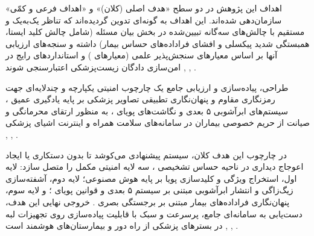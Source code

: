 



اهداف این پژوهش در دو سطح «هدف اصلی (کلان)» و «اهداف فرعی و کمّی» سازمان‌دهی شده‌اند. این اهداف به گونه‌ای تدوین گردیده‌اند که تناظر یک‌به‌یک و مستقیم با چالش‌های سه‌گانه تبیین‌شده در بخش بیان مسئله (شامل چالش کلید ایستا، همبستگی شدید پیکسلی و افشای فراداده‌های حساس بیمار) داشته و سنجه‌های ارزیابی آنها بر اساس معیارهای سنجش‌پذیر علمی (معیارهای ) و استانداردهای رایج در امن‌سازی دادگان زیست‌پزشکی اعتبارسنجی شوند , , .\par




طراحی، پیاده‌سازی و ارزیابی جامع یک چارچوب امنیتی یکپارچه و چندلایه‌ای جهت رمزنگاری مقاوم و پنهان‌نگاری تطبیقی تصاویر پزشکی بر پایه یادگیری عمیق ، سیستم‌های ابرآشوبی ۵ بعدی و نگاشت‌های پویای ، به منظور ارتقای محرمانگی و صیانت از حریم خصوصی بیماران در سامانه‌های سلامت همراه و اینترنت اشیای پزشکی , , .\par



در چارچوب این هدف کلان، سیستم پیشنهادی می‌کوشد تا بدون دستکاری یا ایجاد اعوجاج دیداری در ناحیه حساس تشخیصی ، سه لایه امنیتی مکمل را متصل سازد: لایه اول، استخراج ویژگی و کلیدسازی پویا بر پایه هوش مصنوعی؛ لایه دوم، آشفته‌سازی زیگ‌زاگی و انتشار ابرآشوبی مبتنی بر سیستم ۵ بعدی و قوانین پویای ؛ و لایه سوم، پنهان‌نگاری فراداده‌های بیمار مبتنی بر برجستگی بصری . خروجی نهایی این هدف، دست‌یابی به سامانه‌ای جامع، پرسرعت و سبک با قابلیت پیاده‌سازی روی تجهیزات لبه  در بسترهای پزشکی از راه دور  و بیمارستان‌های هوشمند است , , .\par




